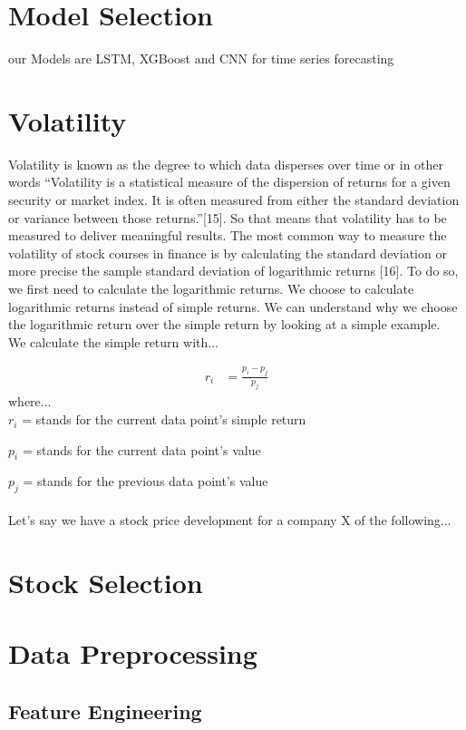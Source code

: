 \documentclass[a4paper,12pt]{report}
\begin{document}
	\section{Model Selection}
	our Models are LSTM, XGBoost and CNN for time series forecasting
	
	\section{Volatility}
	Volatility is known as the degree to which data disperses over time or in other words “Volatility is a statistical measure of the dispersion of returns for a given security or market index. It is often measured from either the standard deviation or variance between those returns.”[15]. So that means that volatility has to be measured to deliver meaningful results. The most common way to measure the volatility of stock courses in finance is by calculating the standard deviation or more precise the sample standard deviation of logarithmic returns [16]. To do so, we first need to calculate the logarithmic returns. We choose to calculate logarithmic returns instead of simple returns. We can understand why we choose the logarithmic return over the simple return by looking at a simple example.\\
We calculate the simple return with...

\begin{align}
r_i &= \frac{p_i - p_j}{p_j}
\end{align}
where...\\

$r_i$ = stands for the current data point’s simple return

$p_i$ = stands for the current data point’s value

$p_j$ = stands for the previous data point’s value\\\\
Let's say we have a stock price development for a company X of the following...


	\section{Stock Selection}
	\section{Data Preprocessing}

		\subsection{Feature Engineering}
\end{document}
